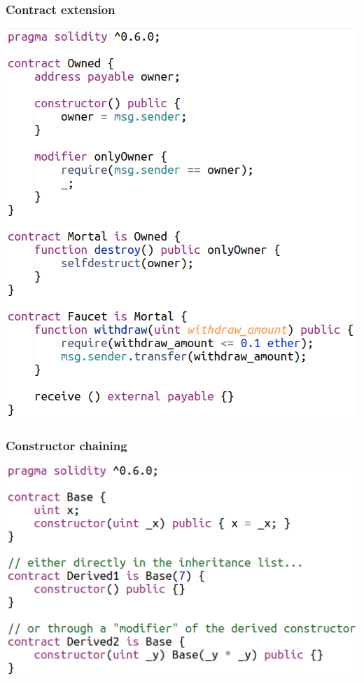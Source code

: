 \documentclass[11pt]{beamer}  %
\begin{document}
\begin{frame}\frametitle{Contract extension}

  \begin{greenbox}{}
    \begin{center}
      \includegraphics[scale=0.38,clip=false]{pictures/subcontracts.png}
    \end{center}
  \end{greenbox}

\end{frame}

\begin{frame}\frametitle{Constructor chaining}

  \begin{greenbox}{}
    \begin{center}
      \includegraphics[scale=0.5,clip=false]{pictures/constructor_chaining.png}
    \end{center}
  \end{greenbox}

\end{frame}
\end{document}
